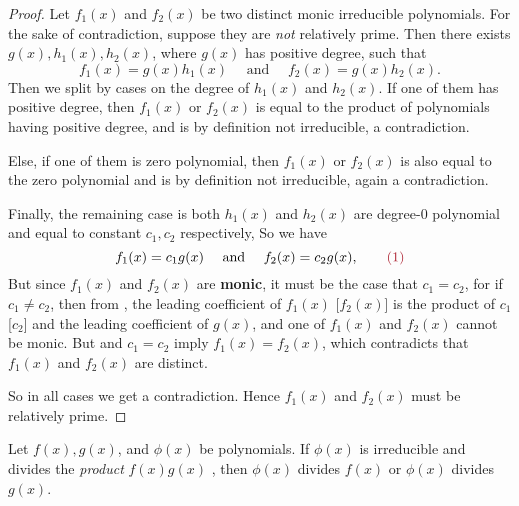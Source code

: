 \begin{proof}
Let \(f_1(x)\) and \(f_2(x)\) be two distinct monic irreducible polynomials.
For the sake of contradiction, suppose they are \emph{not} relatively prime.
Then there exists \(g(x), h_1(x), h_2(x)\), where \(g(x)\) has positive degree, such that
\[
    f_1(x) = g(x) h_1(x) \quad \text{ and } \quad f_2(x) = g(x) h_2(x).
\]
Then we split by cases on the degree of \(h_1(x)\) and \(h_2(x)\).
If one of them has positive degree, then \(f_1(x)\) or \(f_2(x)\) is equal to the product of polynomials having positive degree, and is by definition not irreducible, a contradiction.

Else, if one of them is zero polynomial, then \(f_1(x)\) or \(f_2(x)\) is also equal to the zero polynomial and is by definition not irreducible, again a contradiction.

Finally, the remaining case is both \(h_1(x)\) and \(h_2(x)\) are degree-\(0\) polynomial and equal to constant \(c_1, c_2\) respectively, 
So we have
\[
    f_1(x) = c_1 g(x) \quad \text{ and } \quad f_2(x) = c_2 g(x), \quad \quad \MAROON{(1)}
\]
But since \(f_1(x)\) and \(f_2(x)\) are \textbf{monic}, it must be the case that \(c_1 = c_2\), for if \(c_1 \ne c_2\), then from , the leading coefficient of \(f_1(x)\) [\(f_2(x)\)] is the product of \(c_1\) [\(c_2\)] and the leading coefficient of \(g(x)\), and one of \(f_1(x)\) and \(f_2(x)\) cannot be monic.
But  and \(c_1 = c_2\) imply \(f_1(x) = f_2(x)\), which contradicts that \(f_1(x)\) and \(f_2(x)\) are distinct.

So in all cases we get a contradiction.
Hence \(f_1(x)\) and \(f_2(x)\) must be relatively prime.
\end{proof}

\begin{appendix theorem} \label{thm e.8}
Let \(f(x), g(x)\), and \(\phi(x)\) be polynomials.
If \(\phi(x)\) is irreducible and divides the \emph{product} \(f(x)g(x)\) , \quad then \(\phi(x)\) divides \(f(x)\) or \(\phi(x)\) divides \(g(x)\).
\end{appendix theorem}

